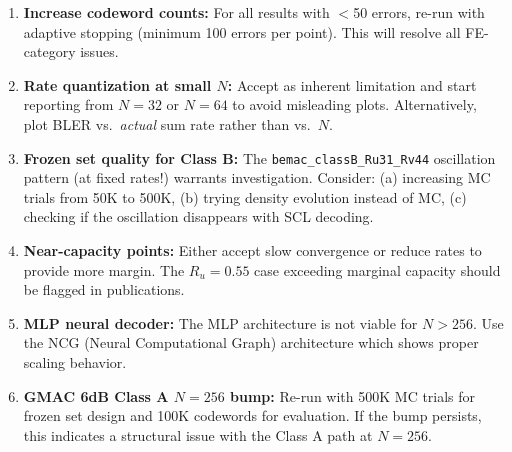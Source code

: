 \documentclass[11pt,a4paper]{article}
\begin{document}
\begin{enumerate}
\item \textbf{Increase codeword counts:} For all results with $<$50 errors, re-run with adaptive stopping (minimum 100 errors per point). This will resolve all FE-category issues.

\item \textbf{Rate quantization at small $N$:} Accept as inherent limitation and start reporting from $N=32$ or $N=64$ to avoid misleading plots. Alternatively, plot BLER vs.\ \emph{actual} sum rate rather than vs.\ $N$.

\item \textbf{Frozen set quality for Class B:} The \texttt{bemac\_classB\_Ru31\_Rv44} oscillation pattern (at fixed rates!) warrants investigation. Consider: (a) increasing MC trials from 50K to 500K, (b) trying density evolution instead of MC, (c) checking if the oscillation disappears with SCL decoding.

\item \textbf{Near-capacity points:} Either accept slow convergence or reduce rates to provide more margin. The $R_u=0.55$ case exceeding marginal capacity should be flagged in publications.

\item \textbf{MLP neural decoder:} The MLP architecture is not viable for $N>256$. Use the NCG (Neural Computational Graph) architecture which shows proper scaling behavior.

\item \textbf{GMAC 6dB Class A $N=256$ bump:} Re-run with 500K MC trials for frozen set design and 100K codewords for evaluation. If the bump persists, this indicates a structural issue with the Class A path at $N=256$.
\end{enumerate}
\end{document}
